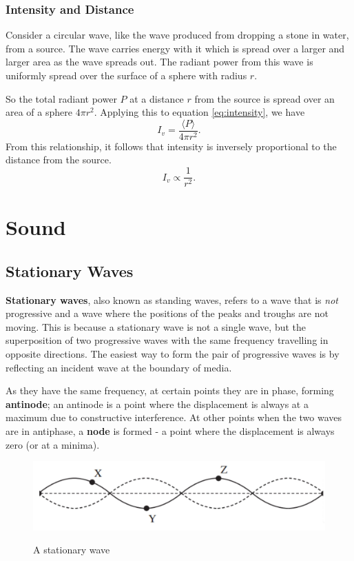 \subsubsection{Intensity and Distance}

Consider a circular wave, like the wave produced from dropping a stone in water, from a source. The wave carries energy with it which is spread over a larger and larger area as the wave spreads out. The radiant power from this wave is uniformly spread over the surface of a sphere with radius $r$. 

So the total radiant power $P$ at a distance $r$ from the source is spread over an area of a sphere $4\pi r^2$. Applying this to equation \ref{eq:intensity}, we have
\begin{equation}
    I_v = \frac{\langle P \rangle}{4 \pi r^2}.
\end{equation}
From this relationship, it follows that intensity is inversely proportional to the distance from the source.
\begin{equation}
    I_v \propto \frac{1}{r^2}.
\end{equation}

\section{Sound}

\subsection{Stationary Waves}

\textbf{Stationary waves}, also known as standing waves, refers to a wave that is \textit{not} progressive and a wave where the positions of the peaks and troughs are not moving. This is because a stationary wave is not a single wave, but the superposition of two progressive waves with the same frequency travelling in opposite directions. The easiest way to form the pair of progressive waves is by reflecting an incident wave at the boundary of media.

As they have the same frequency, at certain points they are in phase, forming \textbf{antinode}; an antinode is a point where the displacement is always at a maximum due to constructive interference.  At other points when the two waves are in antiphase, a \textbf{node} is formed - a point where the displacement is always zero (or at a minima). 

\begin{figure}[h!]
    \centering
    \includegraphics[scale=0.5]{notes/images/Stationary-Wave-Phase-Difference.JPG}
    \label{fig:stationary-wave}
    \caption{A stationary wave}
\end{figure}
\FloatBarrier


